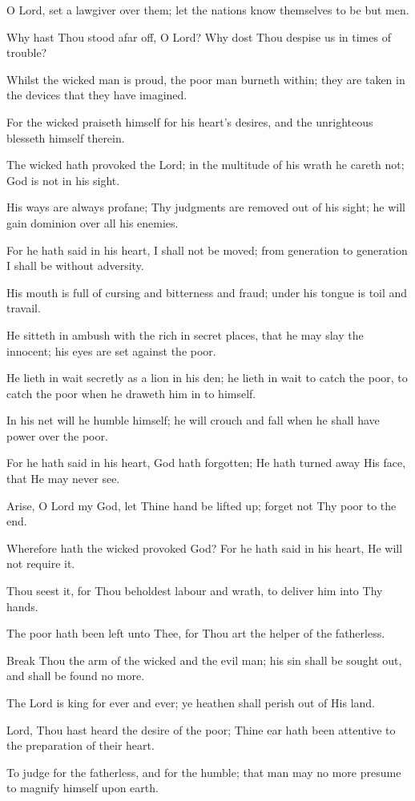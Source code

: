 O Lord, set a lawgiver over them; let the nations know themselves to be but men.

Why hast Thou stood afar off, O Lord? Why dost Thou despise us in times of trouble?

Whilst the wicked man is proud, the poor man burneth within; they are taken in the devices that they have imagined.

For the wicked praiseth himself for his heart’s desires, and the unrighteous blesseth himself therein.

The wicked hath provoked the Lord; in the multitude of his wrath he careth not; God is not in his sight.

His ways are always profane; Thy judgments are removed out of his sight; he will gain dominion over all his enemies.

For he hath said in his heart, I shall not be moved; from generation to generation I shall be without adversity.

His mouth is full of cursing and bitterness and fraud; under his tongue is toil and travail.

He sitteth in ambush with the rich in secret places, that he may slay the innocent; his eyes are set against the poor.

He lieth in wait secretly as a lion in his den; he lieth in wait to catch the poor, to catch the poor when he draweth him in to himself.

In his net will he humble himself; he will crouch and fall when he shall have power over the poor.

For he hath said in his heart, God hath forgotten; He hath turned away His face, that He may never see.

Arise, O Lord my God, let Thine hand be lifted up; forget not Thy poor to the end.

Wherefore hath the wicked provoked God? For he hath said in his heart, He will not require it.

Thou seest it, for Thou beholdest labour and wrath, to deliver him into Thy hands.

The poor hath been left unto Thee, for Thou art the helper of the fatherless.

Break Thou the arm of the wicked and the evil man; his sin shall be sought out, and shall be found no more.

The Lord is king for ever and ever; ye heathen shall perish out of His land.

Lord, Thou hast heard the desire of the poor; Thine ear hath been attentive to the preparation of their heart.

To judge for the fatherless, and for the humble; that man may no more presume to magnify himself upon earth.
